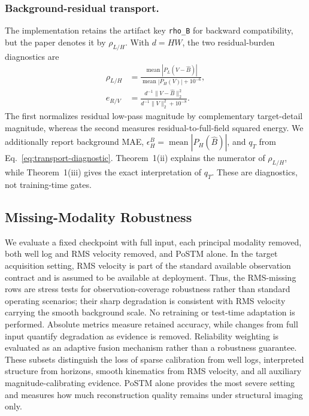 \subsubsection{Background-residual transport.}
\label{app:background-diagnostics}
The implementation retains the artifact key \texttt{rho\_B} for backward compatibility, but the paper denotes it by $\rho_{L/H}$. With $d=HW$, the two residual-burden diagnostics are
\begin{align}
\rho_{L/H}
&=\frac{\operatorname{mean}|P_L(V-\hat B)|}
{\operatorname{mean}|P_H(V)|+10^{-6}},\\
e_{R/V}
&=\frac{d^{-1}\|V-\hat B\|_2^2}
{d^{-1}\|V\|_2^2+10^{-8}}.
\end{align}
The first normalizes residual low-pass magnitude by complementary target-detail magnitude, whereas the second measures residual-to-full-field squared energy. We additionally report background MAE, $\epsilon_H^B=\operatorname{mean}|P_H(\hat B)|$, and $q_T$ from Eq.~\ref{eq:transport-diagnostic}. Theorem~1(ii) explains the numerator of $\rho_{L/H}$, while Theorem~1(iii) gives the exact interpretation of $q_T$. These are diagnostics, not training-time gates.

\subsection{Missing-Modality Robustness}
\label{app:missing-modality}
We evaluate a fixed checkpoint with full input, each principal modality removed, both well log and RMS velocity removed, and PoSTM alone. In the target acquisition setting, RMS velocity is part of the standard available observation contract and is assumed to be available at deployment. Thus, the RMS-missing rows are stress tests for observation-coverage robustness rather than standard operating scenarios; their sharp degradation is consistent with RMS velocity carrying the smooth background scale. No retraining or test-time adaptation is performed. Absolute metrics measure retained accuracy, while changes from full input quantify degradation as evidence is removed. Reliability weighting is evaluated as an adaptive fusion mechanism rather than a robustness guarantee. These subsets distinguish the loss of sparse calibration from well logs, interpreted structure from horizons, smooth kinematics from RMS velocity, and all auxiliary magnitude-calibrating evidence. PoSTM alone provides the most severe setting and measures how much reconstruction quality remains under structural imaging only.

